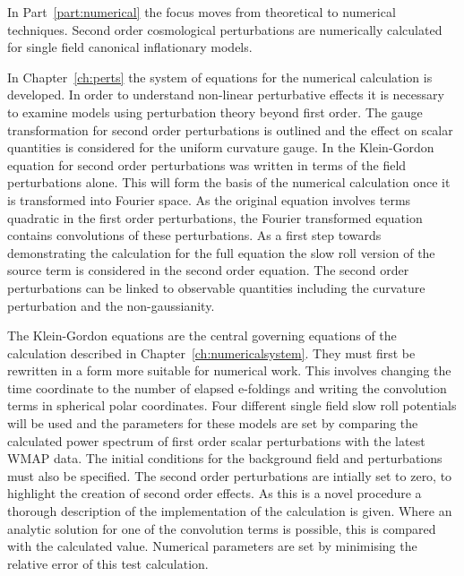 In Part~\ref{part:numerical} the focus moves from theoretical to numerical
techniques. Second order cosmological perturbations are numerically calculated for
single field canonical inflationary models.

In Chapter~\ref{ch:perts} the system of equations for the numerical calculation is
developed. In order to understand non-linear perturbative effects it is necessary to
examine models using perturbation theory beyond first order. The gauge
transformation for second order perturbations is outlined and the effect on
scalar quantities is considered for the uniform curvature gauge. In
 the Klein-Gordon equation for second order perturbations was
written in terms of the field perturbations alone. This will form the basis of the
numerical calculation once it is transformed into Fourier space. As the original
equation involves terms quadratic in the first order perturbations, the Fourier
transformed equation contains convolutions of these perturbations. As a first step
towards demonstrating the calculation for the full equation the slow roll version of
the source term is considered in the second order equation. The second order
perturbations can be linked to observable quantities including the curvature
perturbation and the non-gaussianity.



The Klein-Gordon equations are the central governing equations of the 
calculation described in Chapter~\ref{ch:numericalsystem}. They must first be
rewritten in a form more suitable for numerical work. This involves changing the
time coordinate to the number of elapsed e-foldings and writing the convolution
terms in spherical polar coordinates. Four different single field slow roll
potentials will be used and the parameters for these models are set by comparing
the calculated power spectrum of first order scalar perturbations with the latest
WMAP data. The initial conditions for the background field and perturbations must
also be specified. The second order perturbations are intially set to zero, to
highlight the creation of second order effects. As this is a novel procedure a
thorough description of the implementation of the calculation is given. Where
an analytic solution for one of the convolution terms is possible, this is compared
with the calculated value. Numerical parameters are set by minimising the relative
error of this test calculation.



